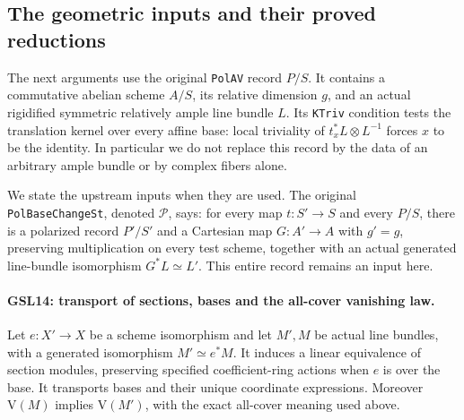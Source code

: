 \subsection{The geometric inputs and their proved reductions}

The next arguments use the original \texttt{PolAV} record $P/S$.
It contains a commutative abelian scheme $A/S$, its relative dimension
$g$, and an actual rigidified symmetric relatively ample line bundle
$L$.  Its \texttt{KTriv} condition tests the translation kernel over
every affine base: local triviality of $t_x^*L\otimes L^{-1}$ forces
$x$ to be the identity.  In particular we do not replace this record
by the data of an arbitrary ample bundle or by complex fibers alone.

We state the upstream inputs when they are used.  The original
\texttt{PolBaseChangeSt}, denoted $\mathcal P$, says: for every map
$t:S'\to S$ and every $P/S$, there is a polarized record $P'/S'$
and a Cartesian map $G:A'\to A$ with $g'=g$, preserving multiplication
on every test scheme, together with an actual generated
line-bundle isomorphism $G^*L\simeq L'$.  This entire record remains
an input here.

\paragraph{GSL14: transport of sections, bases and the all-cover vanishing law.}
\label{claim:GSL14}
Let $e:X'\to X$ be a scheme isomorphism and let $M',M$ be actual
line bundles, with a generated isomorphism $M'\simeq e^*M$.
It induces a linear equivalence of section modules, preserving
specified coefficient-ring actions when $e$ is over the base.
It transports bases and their unique coordinate expressions.
Moreover $\mathrm V(M)$ implies $\mathrm V(M')$, with the exact
all-cover meaning used above.

